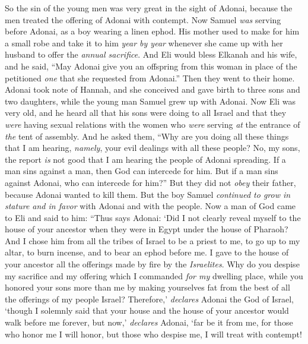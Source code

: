 \begin{biblechapter}
\verse So the sin of the young men was very great in the sight of Adonai, because the men treated the offering of Adonai with contempt.
 Now Samuel \textit{was} serving before Adonai, as a boy wearing a linen ephod.
\verse His mother used to make for him a small robe and take it to him \textit{year by year} whenever she came up with her husband to offer the \textit{annual sacrifice}.
\verse And Eli would bless Elkanah and his wife, and he said, “May Adonai give you an offspring from this woman in place of the petitioned \textit{one} that she requested from Adonai.” Then they went to their home.
\verse Adonai took note of Hannah, and she conceived and gave birth to three sons and two daughters, while the young man Samuel grew up with Adonai.
 Now Eli was very old, and he heard all that his sons were doing to all Israel and that they \textit{were} having sexual relations with the women who \textit{were} serving \textit{at} the entrance of \textit{the} tent of assembly.
\verse And he asked them, “Why are you doing all these things that I am hearing, \textit{namely}, your evil dealings with all these people?
\verse No, my sons, the report \textit{is} not good that I am hearing the people of Adonai spreading.
\verse If a man sins against a man, then God can intercede for him. But if a man sins against Adonai, who can intercede for him?” But they did not \textit{obey} their father, because Adonai wanted to kill them.
\verse But the boy Samuel \textit{continued to grow in stature and in favor} with Adonai and with the people.
 Now a man of God came to Eli and said to him: “Thus says Adonai: ‘Did I not clearly reveal myself to the house of your ancestor when they were in Egypt under the house of Pharaoh?
\verse And I chose him from all the tribes of Israel to be a priest to me, to go up to my altar, to burn incense, and to bear an ephod before me. I gave to the house of your ancestor all the offerings made by fire by the \textit{Israelites}.
\verse Why do you despise my sacrifice and my offering which I commanded \textit{for my} dwelling place, while you honored your sons more than me by making yourselves fat from the best of all the offerings of my people Israel?
\verse Therefore,’ \textit{declares} Adonai the God of Israel, ‘though I solemnly said that your house and the house of your ancestor would walk before me forever, but now,’ \textit{declares} Adonai, ‘far be it from me, for those who honor me I will honor, but those who despise me, I will treat with contempt!

\end{biblechapter}
